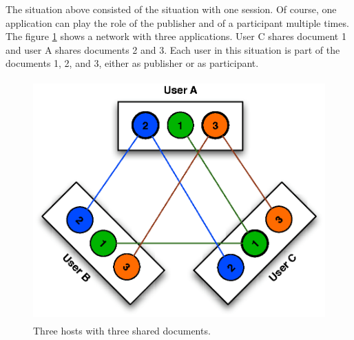 \documentclass[11pt,a4paper]{article}
\begin{document}
The situation above consisted of the situation with one session. Of course, 
one application can play the role of the publisher and of a participant 
multiple times. The figure \ref{fig:collaboration} shows a network with three 
applications. User C shares document 1 and user A shares documents 2 and 3. 
Each user in this situation is part of the documents 1, 2, and 3, either as 
publisher or as participant.

\begin{figure}[H]
 \centering
 \includegraphics[width=11.57cm,height=9.24cm]{../images/collaboration.eps}
 \caption{Three hosts with three shared documents.}
 \label{fig:collaboration}
\end{figure}
\end{document}
